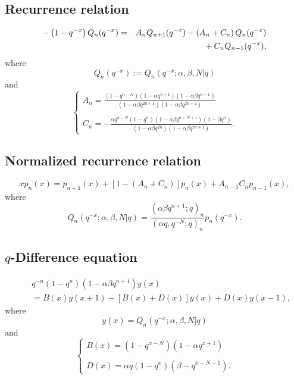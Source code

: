 \documentclass[envcountchap,graybox]{svmono}
\newcommand{\mathindent}{\hspace{7.5mm}}
\begin{document}
\newpage

\subsection*{Recurrence relation}
\begin{eqnarray}
\label{RecqHahn}
-\left(1-q^{-x}\right)Q_n(q^{-x})&=&A_nQ_{n+1}(q^{-x})-\left(A_n+C_n\right)Q_n(q^{-x})\nonumber\\
& &{}\mathindent{}+C_nQ_{n-1}(q^{-x}),
\end{eqnarray}
where
$$Q_n(q^{-x}):=Q_n(q^{-x};\alpha,\beta,N|q)$$
and
$$\left\{\begin{array}{l}
\displaystyle A_n=\frac{(1-q^{n-N})(1-\alpha q^{n+1})(1-\alpha\beta q^{n+1})}{(1-\alpha\beta q^{2n+1})(1-\alpha\beta q^{2n+2})}\\
\\
\displaystyle C_n=-\frac{\alpha q^{n-N}(1-q^n)(1-\alpha\beta q^{n+N+1})(1-\beta q^n)}{(1-\alpha\beta q^{2n})(1-\alpha\beta q^{2n+1})}.
\end{array}\right.$$

\subsection*{Normalized recurrence relation}
\begin{equation}
\label{NormRecqHahn}
xp_n(x)=p_{n+1}(x)+\left[1-(A_n+C_n)\right]p_n(x)+A_{n-1}C_np_{n-1}(x),
\end{equation}
where
$$Q_n(q^{-x};\alpha,\beta,N|q)=
\frac{(\alpha\beta q^{n+1};q)_n}{(\alpha q,q^{-N};q)_n}p_n(q^{-x}).$$

\subsection*{$q$-Difference equation}
\begin{eqnarray}
\label{dvqHahn}
& &q^{-n}(1-q^n)(1-\alpha\beta q^{n+1})y(x)\nonumber\\
& &{}=B(x)y(x+1)-\left[B(x)+D(x)\right]y(x)+D(x)y(x-1),
\end{eqnarray}
where
$$y(x)=Q_n(q^{-x};\alpha,\beta,N|q)$$
and
$$\left\{\begin{array}{l}\displaystyle B(x)=(1-q^{x-N})(1-\alpha q^{x+1})\\
\\
\displaystyle D(x)=\alpha q(1-q^x)(\beta-q^{x-N-1}).\end{array}\right.$$

\newpage
\end{document}
